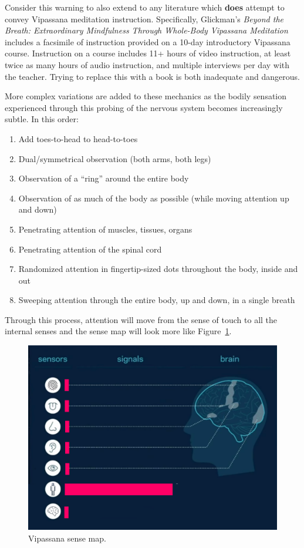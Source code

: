 \documentclass{article}
\begin{document}
Consider this warning to also extend to any literature which \textbf{does} attempt to convey Vipassana meditation instruction. Specifically, Glickman's \textit{Beyond the Breath: Extraordinary Mindfulness Through Whole-Body Vipassana Meditation} \cite{glickman} includes a facsimile of instruction provided on a 10-day introductory Vipassana course. Instruction on a course includes 11+ hours of video instruction, at least twice as many hours of audio instruction, and multiple interviews per day with the teacher. Trying to replace this with a book is both inadequate and dangerous.

More complex variations are added to these mechanics as the bodily sensation experienced through this probing of the nervous system becomes increasingly subtle. In this order:

\begin{enumerate}
  \item Add toes-to-head to head-to-toes
  \item Dual/symmetrical observation (both arms, both legs)
  \item Observation of a ``ring'' around the entire body
  \item Observation of as much of the body as possible (while moving attention up and down)
  \item Penetrating attention of muscles, tissues, organs
  \item Penetrating attention of the spinal cord
  \item Randomized attention in fingertip-sized dots throughout the body, inside and out
  \item Sweeping attention through the entire body, up and down, in a single breath
\end{enumerate}

Through this process, attention will move from the sense of touch to all the internal senses and the sense map will look more like Figure~\ref{fig:vipassana-sense-map-1}.

\begin{figure}[H]
  \centering
  \includegraphics[width=\linewidth]{images/ma-vipassana1.png}
  \caption{Vipassana sense map.}
  \label{fig:vipassana-sense-map-1}
\end{figure}
\end{document}
